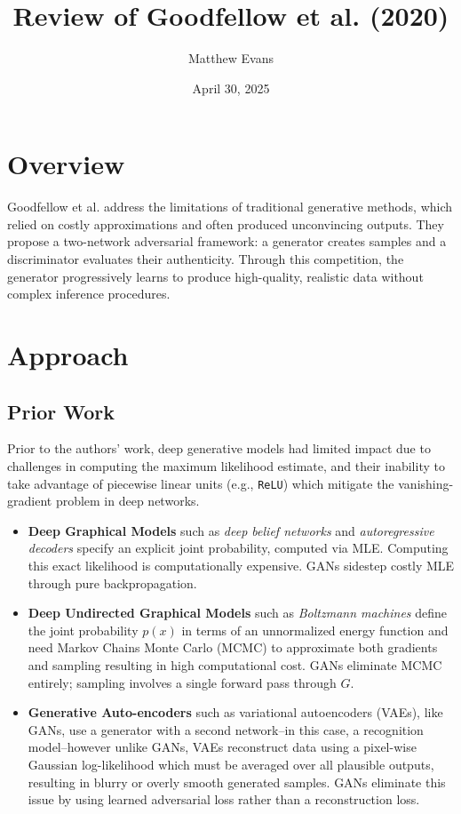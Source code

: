 \documentclass[10pt]{article}
\title{
    Review of Goodfellow et al. (2020) \\
}
\author{Matthew Evans}
\date{April 30, 2025}
\begin{document}
\maketitle

\section*{Overview}
Goodfellow et al. \cite{10.1145/3422622} address the limitations of traditional generative methods, which relied on costly approximations and often produced unconvincing outputs. They propose a two-network adversarial framework: a generator creates samples and a discriminator evaluates their authenticity. Through this competition, the generator progressively learns to produce high-quality, realistic data without complex inference procedures.


\section*{Approach}
\subsection*{Prior Work}
Prior to the authors' work, deep generative models had limited impact due to challenges in computing the maximum likelihood estimate, and their inability to take advantage of piecewise linear units (e.g., \texttt{ReLU}) which mitigate the vanishing-gradient problem in deep networks.

\begin{itemize}
    \item \textbf{Deep Graphical Models} such as \textit{deep belief networks} and \textit{autoregressive decoders} specify an explicit joint probability, computed via MLE. Computing this exact likelihood is computationally expensive. GANs sidestep costly MLE through pure backpropagation.
    \item \textbf{Deep Undirected Graphical Models} such as \textit{Boltzmann machines} define the joint probability \(p(x)\) in terms of an unnormalized energy function and need Markov Chains Monte Carlo (MCMC) to approximate both gradients and sampling resulting in high computational cost. GANs eliminate MCMC entirely; sampling involves a single forward pass through \(G\).
    \item \textbf{Generative Auto-encoders} such as variational autoencoders (VAEs), like GANs, use a generator with a second network–in this case, a recognition model–however unlike GANs, VAEs reconstruct data using a pixel-wise Gaussian log-likelihood which must be averaged over all plausible outputs, resulting in blurry or overly smooth generated samples. GANs eliminate this issue by using learned adversarial loss rather than a reconstruction loss.
\end{itemize}
\end{document}
